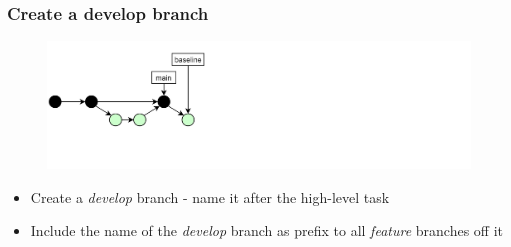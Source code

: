 \documentclass[aspectratio=169]{beamer} %
\begin{document}
\begin{frame}
	\frametitle{Create a develop branch}

	\vspace{-.5cm}
	\begin{minipage}[t][5cm][t]{\textwidth}
		\begin{figure}
			\centering
			\includegraphics[width=\textwidth]{./img/dime-gitflow-network-2-1.png}
		\end{figure}
	\end{minipage}

	\vspace{-.5cm}
	\begin{minipage}[t][5cm][t]{\textwidth}
		\begin{itemize}
			\setlength\itemsep{1em}
			\item Create a \textit{develop} branch
			- name it after the high-level task
			\item Include the name of the \textit{develop} branch as prefix
			to all \textit{feature} branches off it
		\end{itemize}
	\end{minipage}
\end{frame}
\end{document}
